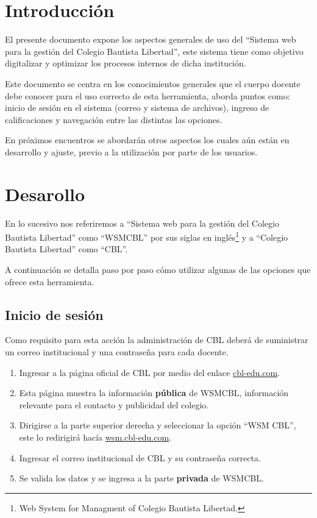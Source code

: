 \documentclass[12pt]{article}
\begin{document}
    

    \tableofcontents

    \section{Introducción}

    El presente documento expone los aspectos generales de uso del ``Sistema web para la gestión del Colegio Bautista Libertad'',
    este sistema tiene como objetivo digitalizar y optimizar los procesos internos de dicha institución.

    Este documento se centra en los conocimientos generales que el cuerpo docente debe conocer para el uso correcto de esta herramienta, 
    aborda puntos como: inicio de sesión en el sistema (correo y sistema de archivos), ingreso de calificaciones y navegación entre las distintas las opciones.

    En próximos encuentros se abordarán otros aspectos los cuales aún están en desarrollo y ajuste, previo a la utilización por parte de los usuarios.

    \section{Desarollo}

    En lo sucesivo nos referiremos a ``Sistema web para la gestión del Colegio Bautista Libertad''
    como ``WSMCBL'' por sus siglas en inglés\footnote{Web System for Managment of Colegio Bautista Libertad.} y
    a ``Colegio Bautista Libertad'' como ``CBL''.

    A continuación se detalla paso por paso cómo utilizar algunas de las opciones que ofrece esta herramienta.
    
    \subsection{Inicio de sesión}

    Como requisito para esta acción la administración de CBL deberá de suministrar un correo institucional y una contraseña para cada docente.

    \begin{enumerate}
        \item Ingresar a la página oficial de CBL por medio del enlace \href{www.cbl-edu.com}{cbl-edu.com}.
        \item Esta página muestra la información \textbf{pública} de WSMCBL, información relevante para el contacto y publicidad del colegio.
        \item Dirigirse a la parte superior derecha y seleccionar la opción ``WSM CBL'', este lo redirigirá hacía \href{wsm.cbl-edu.com}{wsm.cbl-edu.com}.
        \item Ingresar el correo institucional de CBL y su contraseña correcta.
        \item Se valida los datos y se ingresa a la parte \textbf{privada} de WSMCBL.
    \end{enumerate}
\end{document}
